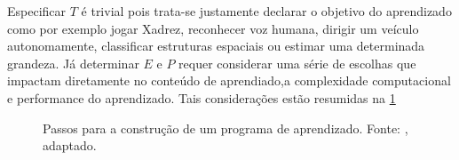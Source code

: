 Especificar $ T $ é trivial pois trata-se justamente declarar o objetivo do aprendizado como por exemplo jogar Xadrez, reconhecer  voz humana, dirigir um veículo autonomamente, classificar estruturas espaciais ou estimar uma determinada grandeza. Já determinar $ E $ e $ P $ requer considerar uma série de escolhas que impactam diretamente no conteúdo de aprendiado,a complexidade computacional e performance do aprendizado. Tais considerações estão resumidas na \cref{fig:michtel_modelagem} 

\begin{figure}[h!]
\centering
{}
\caption[Passos para a construção de um programa de aprendizado.]{Passos para a construção de um programa de aprendizado. Fonte: \cite[p.13]{Mitchell}, adaptado.}
\label{fig:michtel_modelagem}
\end{figure}

